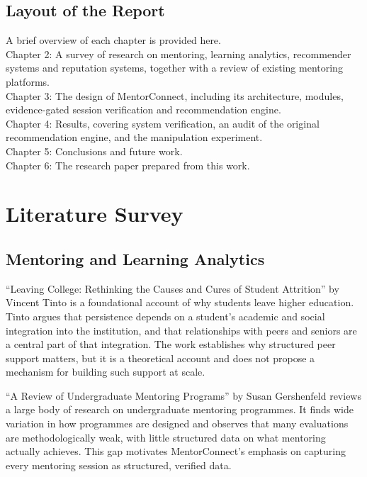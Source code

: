 \documentclass[12pt,a4paper]{report}
\begin{document}
\section{Layout of the Report}
A brief overview of each chapter is provided here.\\
Chapter 2: A survey of research on mentoring, learning analytics, recommender systems and reputation systems, together with a review of existing mentoring platforms.\\
Chapter 3: The design of MentorConnect, including its architecture, modules, evidence-gated session verification and recommendation engine.\\
Chapter 4: Results, covering system verification, an audit of the original recommendation engine, and the manipulation experiment.\\
Chapter 5: Conclusions and future work.\\
Chapter 6: The research paper prepared from this work.

\chapter{Literature Survey}
\section{Mentoring and Learning Analytics}
``Leaving College: Rethinking the Causes and Cures of Student Attrition'' \cite{tinto1993} by Vincent Tinto is a foundational account of why students leave higher education. Tinto argues that persistence depends on a student's academic and social integration into the institution, and that relationships with peers and seniors are a central part of that integration. The work establishes why structured peer support matters, but it is a theoretical account and does not propose a mechanism for building such support at scale.

``A Review of Undergraduate Mentoring Programs'' \cite{gershenfeld2014} by Susan Gershenfeld reviews a large body of research on undergraduate mentoring programmes. It finds wide variation in how programmes are designed and observes that many evaluations are methodologically weak, with little structured data on what mentoring actually achieves. This gap motivates MentorConnect's emphasis on capturing every mentoring session as structured, verified data.
\end{document}
